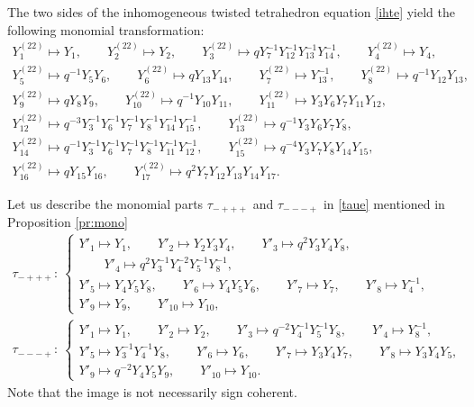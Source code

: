 \documentclass[pdftex]{sigma}
\numberwithin{equation}{section}
\begin{document}
The two sides of the inhomogeneous twisted tetrahedron equation \eqref{ihte} yield the
following monomial transformation:
\begin{gather}
Y^{(22)}_1 \mapsto Y_1, \qquad
Y^{(22)}_2 \mapsto Y_2, \qquad
Y^{(22)}_3 \mapsto qY^{-1}_{7}Y^{-1}_{12}Y^{-1}_{13}Y^{-1}_{14},\qquad
Y^{(22)}_4 \mapsto Y_4,\nonumber
\\
Y^{(22)}_5 \mapsto q^{-1}Y_5Y_6, \qquad
Y^{(22)}_6 \mapsto q Y_{13}Y_{14}, \qquad
Y^{(22)}_7 \mapsto Y^{-1}_{13},\qquad
Y^{(22)}_{8} \mapsto q^{-1}Y_{12}Y_{13},\nonumber\\
Y^{(22)}_{9} \mapsto qY_{8}Y_{9},
\qquad
Y^{(22)}_{10} \mapsto q^{-1}Y_{10}Y_{11}, \qquad
Y^{(22)}_{11} \mapsto Y_3Y_6Y_7Y_{11}Y_{12},\nonumber\\
Y^{(22)}_{12} \mapsto q^{-3}Y^{-1}_{3}Y^{-1}_{6}Y^{-1}_{7}Y^{-1}_{8}Y^{-1}_{14}Y^{-1}_{15},
\qquad
Y^{(22)}_ {13} \mapsto q^{-1}Y_3Y_6Y_7Y_8,\nonumber\\
Y^{(22)}_{14} \mapsto q^{-1}Y^{-1}_{3}Y^{-1}_{6}Y^{-1}_{7}Y^{-1}_{8}Y^{-1}_{11}Y^{-1}_{12},\qquad
Y^{(22)}_ {15} \mapsto q^{-4}Y_3Y_7Y_8Y_{14}Y_{15},\nonumber\\
Y^{(22)}_{16} \mapsto qY_{15}Y_{16},\qquad
Y^{(22)}_{17} \mapsto q^{2}Y_7Y_{12}Y_{13}Y_{14}Y_{17}.\label{y22}
\end{gather}

Let us describe the monomial parts $\tau_{-+++}$ and $\tau_{---+}$ in \eqref{taue} mentioned
in Proposition \ref{pr:mono}
\begin{gather*}
\tau_{-+++}\colon\
\begin{cases}
Y'_1 \mapsto Y_1,\qquad
Y'_2 \mapsto Y_2Y_3Y_4, \qquad
Y'_3 \mapsto q^2Y_3Y_4Y_8, \\ \qquad
Y'_4 \mapsto q^2Y^{-1}_3Y^{-2}_4Y^{-1}_5Y^{-1}_8,
\\
Y'_5 \mapsto Y_4Y_5Y_8, \qquad
Y'_6 \mapsto Y_4 Y_5 Y_6,\qquad
Y'_7 \mapsto Y_7,\qquad
Y'_8 \mapsto Y^{-1}_4,
\\
Y'_9 \mapsto Y_9, \qquad
Y'_{10} \mapsto Y_{10},
\end{cases}
\\
 \tau_{---+}\colon\
\begin{cases}
Y'_1 \mapsto Y_1,\qquad
Y'_2 \mapsto Y_2, \qquad
Y'_3 \mapsto q^{-2}Y^{-1}_4Y^{-1}_5Y_8, \qquad
Y'_4 \mapsto Y^{-1}_8, \qquad
\\
Y'_5 \mapsto Y^{-1}_3Y^{-1}_4Y_8, \qquad
Y'_6 \mapsto Y_6,\qquad
Y'_7 \mapsto Y_3Y_4Y_7,\qquad
Y'_8 \mapsto Y_3Y_4Y_5,
\\
Y'_9 \mapsto q^{-2} Y_4Y_5Y_9, \qquad
Y'_{10} \mapsto Y_{10}.
\end{cases}
\end{gather*}
Note that the image is not necessarily sign coherent.
\end{document}
